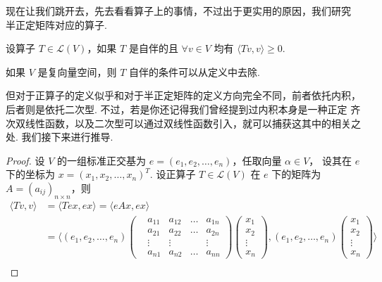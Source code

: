 现在让我们跳开去，先去看看算子上的事情，不过出于更实用的原因，我们研究
半正定矩阵对应的算子. 

\begin{definition}
    设算子 $ T \in \mathcal{L}(V) $，如果 $ T $ 是自伴的且 $ \forall v \in V $
    均有 $ \langle Tv, v \rangle \geqslant 0 $. 
\end{definition}

如果 $ V $ 是复向量空间，则 $ T $ 自伴的条件可以从定义中去除. 

但对于正算子的定义似乎和对于半正定矩阵的定义方向完全不同，前者依托内积，
后者则是依托二次型. 不过，若是你还记得我们曾经提到过内积本身是一种正定
齐次双线性函数，以及二次型可以通过双线性函数引入，就可以捕获这其中的相关之处. 
我们接下来进行推导. 

\begin{proof}
    设 $ V $ 的一组标准正交基为 $ e = (e_1, e_2, \ldots, e_n) $，任取向量 $ \alpha \in V $，
    设其在 $ e $ 下的坐标为 $ x = (x_1, x_2, \ldots, x_n)^{T} $. 设正算子 $ T \in \mathcal{L}(V) $
    在 $ e $ 下的矩阵为 $ A = (a_{ij})_{n \times n}$，则 
    \begin{align*}
        \langle Tv, v \rangle 
        & = \langle Tex, ex \rangle = \langle eAx, ex \rangle \\ 
        & = \langle 
            (e_1, e_2, \ldots ,e_n)
            \begin{pmatrix}
                & a_{11} & a_{12} & \ldots & a_{1n} \\
                & a_{21} & a_{22} & \ldots & a_{2n} \\
                & \vdots & \vdots &        & \vdots \\
                & a_{n1} & a_{n2} & \ldots & a_{nn} 
            \end{pmatrix}
            \begin{pmatrix}
                x_1 \\
                x_2 \\
                \vdots \\
                x_n
            \end{pmatrix} ,
            (e_1, e_2, \ldots ,e_n)
            \begin{pmatrix}
                x_1 \\
                x_2 \\
                \vdots \\
                x_n
            \end{pmatrix}
        \rangle \\

\end{align*}
\end{proof}

